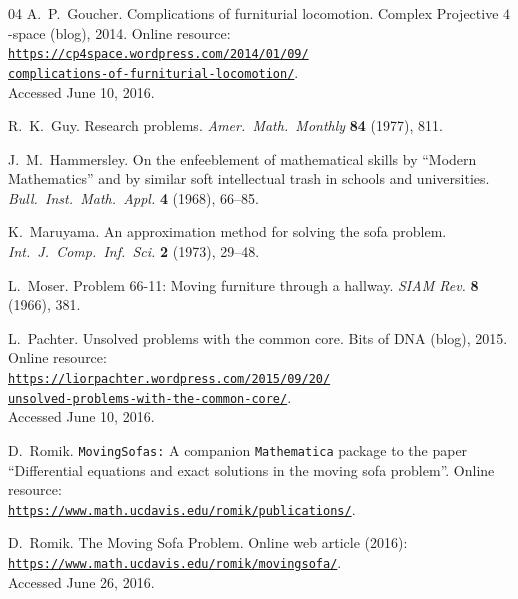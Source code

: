 \documentclass[11pt]{article}
\begin{document}
\begin{thebibliography}{04}
 A.~P.~Goucher. Complications of furniturial locomotion. Complex Projective $4$-space (blog), 2014. Online resource: \\
\href{https://cp4space.wordpress.com/2014/01/09/complications-of-furniturial-locomotion/}{\texttt{https://cp4space.wordpress.com/2014/01/09/\\complications-of-furniturial-locomotion/}}. \\Accessed June 10, 2016.

 R.~K.~Guy. Research problems. \textit{Amer.~Math.~Monthly} \textbf{84} (1977), 811.

 J.~M.~Hammersley. On the enfeeblement of mathematical skills by ``Modern Mathematics'' and by similar soft intellectual trash in schools and universities. \textit{Bull.~Inst.~Math.~Appl.} \textbf{4} (1968), 66--85.

 K.~Maruyama. An approximation method for solving the sofa problem. \textit{Int.~J.~Comp.~Inf.~Sci.} \textbf{2} (1973), 29--48.

 L.~Moser. Problem 66-11: Moving furniture through a hallway. \textit{SIAM Rev.} \textbf{8} (1966), 381.

 L.~Pachter. Unsolved problems with the common core. Bits of DNA (blog), 2015. Online resource: \\ \href{https://liorpachter.wordpress.com/2015/09/20/unsolved-problems-with-the-common-core/}{\texttt{https://liorpachter.wordpress.com/2015/09/20/ \\ unsolved-problems-with-the-common-core/}}. \\ Accessed June 10, 2016.

 D.~Romik. \texttt{MovingSofas:} A companion \texttt{Mathematica} package to the paper ``Differential equations and exact solutions in the moving sofa problem''. Online resource: \\ 
\href{https://www.math.ucdavis.edu/~romik/publications/}{\texttt{https://www.math.ucdavis.edu/\raisebox{-2pt}{\textasciitilde}{}romik/publications/}}.

 D.~Romik. The Moving Sofa Problem. Online web article (2016):\\ \href{https://www.math.ucdavis.edu/~romik/movingsofa/}{\texttt{https://www.math.ucdavis.edu/\raisebox{-2pt}{\textasciitilde}{}romik/movingsofa/}}. \\Accessed June 26, 2016.



\end{thebibliography}
\end{document}
